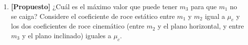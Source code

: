 \documentclass[letterpaper,11pt]{article}
\begin{document}
\begin{enumerate}
\item \textbf{[Propuesto]} ¿Cuál es el máximo valor que puede tener $m_3$ para que $m_1$ no se caiga? Considere el coeficiente de roce estático entre $m_1$ y $m_2$ igual a $\mu_e$ y los dos coeficientes de roce cinemático (entre $m_2$ y el plano horizontal, y entre $m_3$ y el plano inclinado) iguales a $\mu_c$.

\begin{figure}[H]
    \centering
    
\end{figure}

%   

\end{enumerate}
\end{document}
